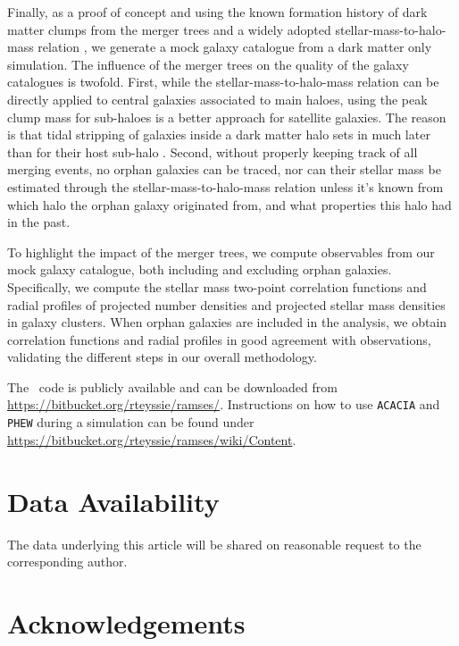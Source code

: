 Finally, as a  proof of concept and using the  known formation history
of  dark matter  clumps from  the merger  trees and  a widely  adopted
stellar-mass-to-halo-mass  relation  \citep{Behroozi}, we  generate  a
mock  galaxy  catalogue  from  a dark  matter  only  simulation.   The
influence of the merger trees on  the quality of the galaxy catalogues
is twofold.   First, while the stellar-mass-to-halo-mass  relation can
be directly  applied to  central galaxies  associated to  main haloes,
using the  peak clump  mass for  sub-haloes is  a better  approach for
satellite galaxies.   The reason is  that tidal stripping  of galaxies
inside  a dark  matter halo  sets in  much later  than for  their host
sub-halo \citep{Nagai}.  Second, without properly keeping track of all
merging  events, no  orphan  galaxies  can be  traced,  nor can  their
stellar  mass  be   estimated  through  the  stellar-mass-to-halo-mass
relation  unless  it's  known  from   which  halo  the  orphan  galaxy
originated from, and what properties this halo had in the past.

To highlight  the impact of  the merger trees, we  compute observables
from our  mock galaxy catalogue,  both including and  excluding orphan
galaxies.  Specifically,   we  compute  the  stellar   mass  two-point
correlation  functions   and  radial  profiles  of   projected  number
densities and projected stellar mass densities in galaxy clusters. When orphan
galaxies are included in the analysis, we obtain correlation functions
and radial  profiles in  good agreement with  observations, validating
the different steps in our overall methodology.

The \ramses\  code is  publicly available and  can be  downloaded from
\url{https://bitbucket.org/rteyssie/ramses/}.  Instructions  on how to
use \texttt{ACACIA} and \texttt{PHEW} during a simulation can be found
under \url{https://bitbucket.org/rteyssie/ramses/wiki/Content}. 

\section*{Data Availability}

The data underlying this article will be shared on reasonable request 
to the corresponding author.

\section*{Acknowledgements}

